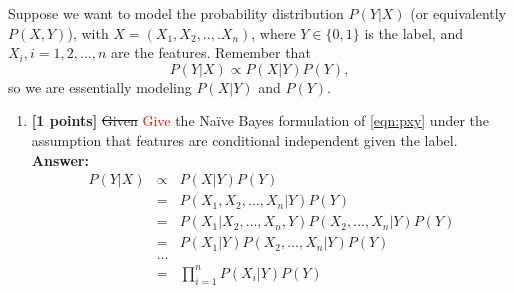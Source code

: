 \documentclass{article}
\begin{document}
Suppose we want to model the probability distribution $P(Y|X)$ (or equivalently $P(X,Y)$), with $X=(X_1,X_2,..,.X_n)$, where $Y\in \{0, 1\}$ is the label, and $X_i, i=1,2,...,n$ are the features. Remember that
\begin{equation}\label{eqn:pxy}
P(Y|X)\propto P(X|Y)P(Y),
\end{equation}
so we are essentially modeling $P(X|Y)$ and $P(Y)$.


\begin{enumerate}
\item\textbf{[1 points]}  \sout{Given} \textcolor{red}{Give} the Na{\"i}ve Bayes formulation of \eqref{eqn:pxy} under the assumption that features are conditional independent given the label.\\
\textbf{Answer:}\\
\begin{equation}
\nonumber
\begin{array}{rcl}
P(Y|X) & \propto & P(X|Y)P(Y) \\
	   & = & P(X_1,X_2,\dots,X_n|Y)P(Y) \\
	   & = & P(X_1|X_2,\dots,X_n,Y)P(X_2,\dots,X_n|Y)P(Y) \\
	   & = & P(X_1|Y)P(X_2,\dots,X_n|Y)P(Y) \\
	   & \dots & \\
	   & = & \prod_{i=1}^{n} P(X_i|Y) P(Y)
\end{array}
\end{equation}




\end{enumerate}
\end{document}
